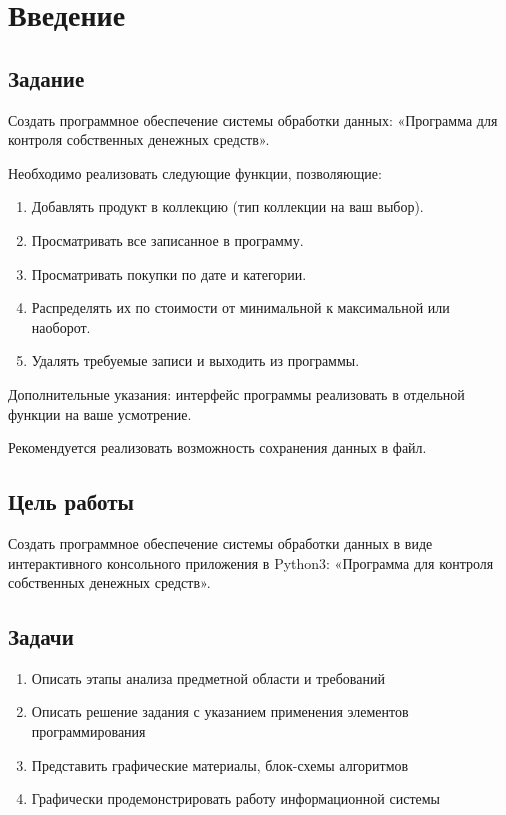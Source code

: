 \documentclass[14pt]{extreport}
\begin{document}
\pagestyle{empty}

\pagestyle{plain}

\tableofcontents

\chapter{Введение}

\section{Задание}

Создать программное обеспечение системы обработки данных: «Программа для контроля собственных денежных средств».

Необходимо реализовать следующие функции, позволяющие:
\begin{enumerate}
\item Добавлять продукт в коллекцию (тип коллекции на ваш выбор).
\item Просматривать все записанное в программу.
\item Просматривать покупки по дате и категории.
\item Распределять их по стоимости от минимальной к максимальной или наоборот.
\item Удалять требуемые записи и выходить из программы.
\end{enumerate}

Дополнительные указания: интерфейс программы реализовать в отдельной функции на ваше усмотрение.

Рекомендуется реализовать возможность сохранения данных в файл.

\section{Цель работы}

Создать программное обеспечение системы обработки данных в виде интерактивного консольного приложения в Python3: «Программа для
контроля собственных денежных средств».

\section{Задачи}

\begin{enumerate}
\item Описать этапы анализа предметной области и требований
\item Описать решение задания с указанием применения элементов программирования
\item Представить графические материалы, блок-схемы алгоритмов
\item Графически продемонстрировать работу информационной системы
\end{enumerate}
\end{document}
